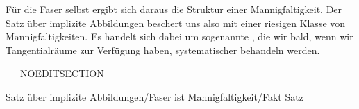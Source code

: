 Für die Faser selbst ergibt sich daraus die Struktur einer Mannigfaltigkeit. Der Satz über implizite Abbildungen beschert uns also mit einer riesigen Klasse von Mannigfaltigkeiten. Es handelt sich dabei um sogenannte  {,} die wir bald, wenn wir Tangentialräume zur Verfügung haben, systematischer behandeln werden.

__NOEDITSECTION__

{Satz über implizite Abbildungen/Faser ist Mannigfaltigkeit/Fakt}
{Satz}
{}
{

\faktzusatz {}
\faktzusatz {}

}
